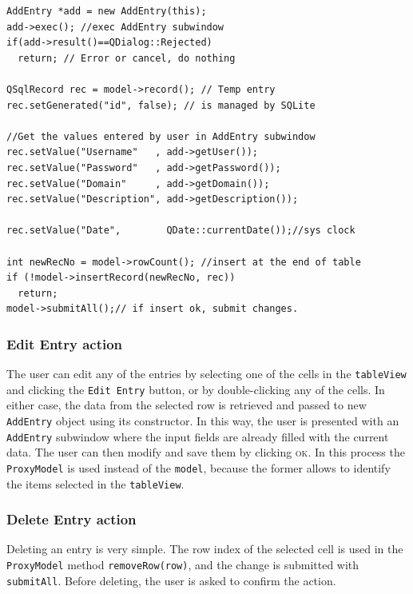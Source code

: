 \begin{lstlisting}[style=customc, float=htb, caption={Add entry to database using model}, label = {lis:addtomodel}]
AddEntry *add = new AddEntry(this);
add->exec(); //exec AddEntry subwindow
if(add->result()==QDialog::Rejected)
  return; // Error or cancel, do nothing

QSqlRecord rec = model->record(); // Temp entry
rec.setGenerated("id", false); // is managed by SQLite

//Get the values entered by user in AddEntry subwindow
rec.setValue("Username"   , add->getUser());
rec.setValue("Password"   , add->getPassword());
rec.setValue("Domain"     , add->getDomain());
rec.setValue("Description", add->getDescription());

rec.setValue("Date",        QDate::currentDate());//sys clock

int newRecNo = model->rowCount(); //insert at the end of table
if (!model->insertRecord(newRecNo, rec))
  return;
model->submitAll();// if insert ok, submit changes.
\end{lstlisting}

\subsubsection*{Edit Entry action}

The user can edit any of the entries by selecting one of the cells in the \texttt{tableView} and clicking the \texttt{Edit Entry} button, or by double-clicking any of the cells. In either case, the data from the selected row is retrieved and passed to new \texttt{AddEntry} object using its constructor. In this way, the user is presented with an \texttt{AddEntry} subwindow where the input fields are already filled with the current data. The user can then modify and save them by clicking \textsc{ok}. In this process the \texttt{ProxyModel} is used instead of the \texttt{model}, because the former allows to identify the items selected in the \texttt{tableView}.

\subsubsection*{Delete Entry action}

Deleting an entry is very simple. The row index of the selected cell is used in the \texttt{ProxyModel} method \texttt{removeRow(row)}, and the change is submitted with \texttt{submitAll}. Before deleting, the user is asked to confirm the action.

